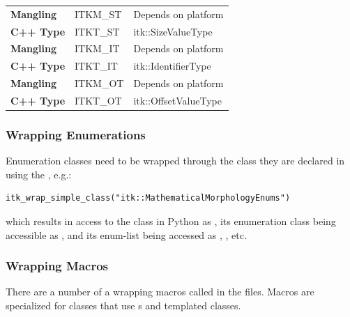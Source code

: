 \begin{table}
\begin{center}
\begin{tabular}{l p{} p{}}
\midrule
\textbf{Mangling} & ITKM\_ST & Depends on platform \\
\textbf{C++ Type} & ITKT\_ST & itk::SizeValueType \\
\midrule
\textbf{Mangling} & ITKM\_IT & Depends on platform \\
\textbf{C++ Type} & ITKT\_IT & itk::IdentifierType \\
\midrule
\textbf{Mangling} & ITKM\_OT & Depends on platform\\
\textbf{C++ Type} & ITKT\_OT & itk::OffsetValueType \\
\bottomrule
\end{tabular}
\end{center}
%
\label{tab:WrappingManglingITKBasicTypes}
\end{table}

\normalsize


\subsubsection{Wrapping Enumerations}

Enumeration classes need to be wrapped through the class they are declared in
using the , e.g.:
\small
\begin{verbatim}
itk_wrap_simple_class("itk::MathematicalMorphologyEnums")
\end{verbatim}
\normalsize

which results in access to the class in Python as
, its  enumeration class
being accessible as , and its
enum-list being accessed as
,
, etc.


\subsubsection{Wrapping Macros}

There are a number of a wrapping macros called in the 
files. Macros are specialized for classes that use s
and templated classes.

